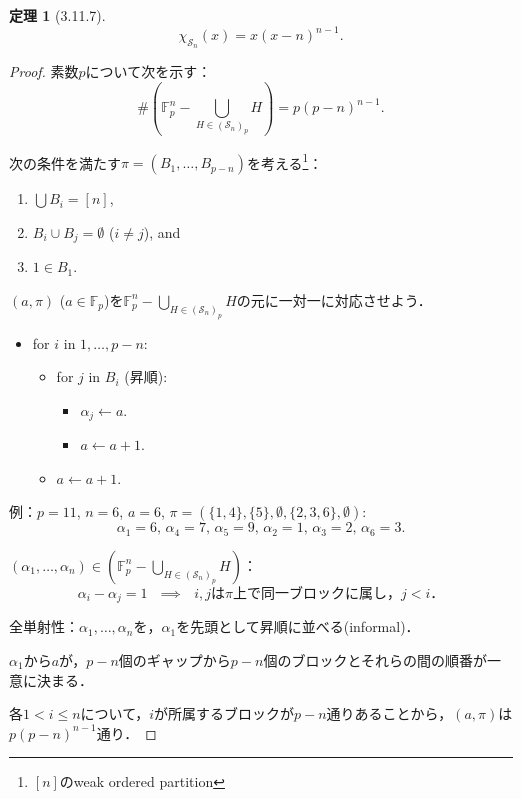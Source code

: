 \documentclass[xelatex,ja=standard,a4paper,14pt,everyparhook=compat]{bxjsarticle}
\newcommand{\bbF}{\mathbb{F}}
\newcommand{\mcS}{\mathcal{S}}
\theoremstyle{definition}
\newtheorem*{theorem}{定理}
\begin{document}
\begin{theorem}[3.11.7]
    \begin{equation*}
        \chi_{\mcS_n}(x) = x(x-n)^{n-1}.
    \end{equation*}
\end{theorem}
\begin{proof}
    素数$p$について次を示す： \begin{equation*}
        \#\left(\bbF_p^n - \bigcup_{H \in (\mcS_n)_p} H\right) = p(p-n)^{n-1}.
    \end{equation*}

    次の条件を満たす$\pi=(B_1,\ldots,B_{p-n})$を考える\footnote{$[n]$のweak ordered partition}： \begin{enumerate}
        \item $\bigcup B_i = [n]$,
        \item $B_i \cup B_j = \emptyset$ ($i \neq j$), and
        \item $1 \in B_1$.
    \end{enumerate}
    $(a, \pi)$ ($a \in \bbF_p$)を$\bbF_p^n-\bigcup_{H \in (\mcS_n)_p} H$の元に一対一に対応させよう．

    \begin{itemize}
        \item for $i$ in $1,\ldots,p-n$: \begin{itemize}
                  \item for $j$ in $B_i$ (昇順): \begin{itemize}
                            \item $\alpha_j \gets a$.
                            \item $a \gets a + 1$.
                        \end{itemize}
                  \item $a \gets a + 1$.
              \end{itemize}
    \end{itemize}
    例：$p = 11$, $n = 6$, $a = 6$, $\pi = (\{1,4\}, \{5\}, \emptyset, \{2,3,6\}, \emptyset)$: \begin{equation*}
        \text{$\alpha_1 = 6$, $\alpha_4 = 7$, $\alpha_5 = 9$, $\alpha_2 = 1$, $\alpha_3 = 2$, $\alpha_6 = 3$.}
    \end{equation*}

    $(\alpha_1,\ldots,\alpha_n) \in \left(\bbF_p^n - \bigcup_{H \in (\mcS_n)_p} H\right)$： \begin{equation*}
        \text{$\alpha_i - \alpha_j = 1$ $\implies$ $i,j$は$\pi$上で同一ブロックに属し，$j < i$．}
    \end{equation*}

    全単射性：$\alpha_1,\ldots,\alpha_n$を，$\alpha_1$を先頭として昇順に並べる(informal)．

    $\alpha_1$から$a$が，$p-n$個のギャップから$p-n$個のブロックとそれらの間の順番が一意に決まる．

    各$1 < i \leq n$について，$i$が所属するブロックが$p-n$通りあることから，$(a,\pi)$は$p (p-n)^{n-1}$通り．
\end{proof}
\end{document}
